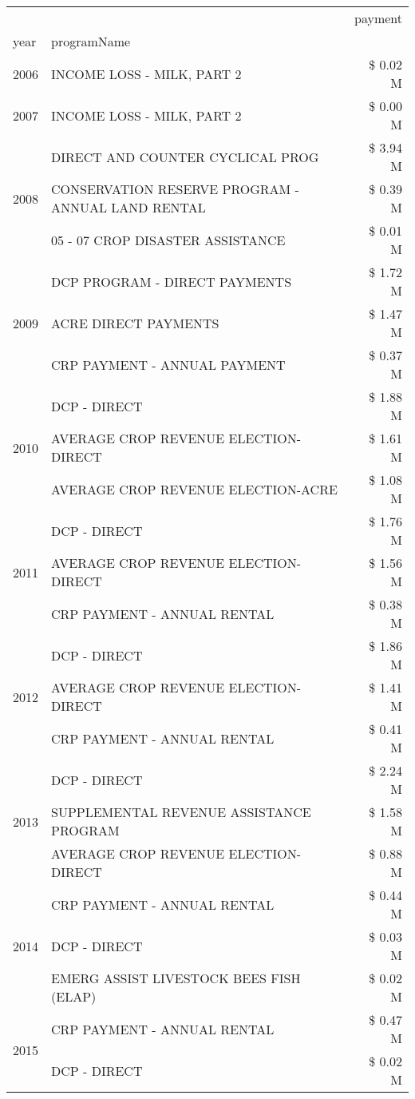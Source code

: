 \begin{tabular}{llr}
\toprule
 &  & payment \\
year & programName &  \\
\midrule
2006 & INCOME LOSS - MILK, PART 2 & \$ 0.02 M \\
\cline{1-3}
2007 & INCOME LOSS - MILK, PART 2 & \$ 0.00 M \\
\cline{1-3}
\multirow[t]{3}{*}{2008} & DIRECT AND COUNTER CYCLICAL PROG & \$ 3.94 M \\
 & CONSERVATION RESERVE PROGRAM - ANNUAL LAND RENTAL & \$ 0.39 M \\
 & 05 - 07 CROP DISASTER ASSISTANCE & \$ 0.01 M \\
\cline{1-3}
\multirow[t]{3}{*}{2009} & DCP PROGRAM - DIRECT PAYMENTS & \$ 1.72 M \\
 & ACRE DIRECT PAYMENTS & \$ 1.47 M \\
 & CRP PAYMENT - ANNUAL PAYMENT & \$ 0.37 M \\
\cline{1-3}
\multirow[t]{3}{*}{2010} & DCP - DIRECT & \$ 1.88 M \\
 & AVERAGE CROP REVENUE ELECTION-DIRECT & \$ 1.61 M \\
 & AVERAGE CROP REVENUE ELECTION-ACRE & \$ 1.08 M \\
\cline{1-3}
\multirow[t]{3}{*}{2011} & DCP - DIRECT & \$ 1.76 M \\
 & AVERAGE CROP REVENUE ELECTION-DIRECT & \$ 1.56 M \\
 & CRP PAYMENT - ANNUAL RENTAL & \$ 0.38 M \\
\cline{1-3}
\multirow[t]{3}{*}{2012} & DCP - DIRECT & \$ 1.86 M \\
 & AVERAGE CROP REVENUE ELECTION-DIRECT & \$ 1.41 M \\
 & CRP PAYMENT - ANNUAL RENTAL & \$ 0.41 M \\
\cline{1-3}
\multirow[t]{3}{*}{2013} & DCP - DIRECT & \$ 2.24 M \\
 & SUPPLEMENTAL REVENUE ASSISTANCE PROGRAM & \$ 1.58 M \\
 & AVERAGE CROP REVENUE ELECTION-DIRECT & \$ 0.88 M \\
\cline{1-3}
\multirow[t]{3}{*}{2014} & CRP PAYMENT - ANNUAL RENTAL & \$ 0.44 M \\
 & DCP - DIRECT & \$ 0.03 M \\
 & EMERG ASSIST LIVESTOCK BEES FISH (ELAP) & \$ 0.02 M \\
\cline{1-3}
\multirow[t]{3}{*}{2015} & CRP PAYMENT - ANNUAL RENTAL & \$ 0.47 M \\
 & DCP - DIRECT & \$ 0.02 M \\

\end{tabular}

